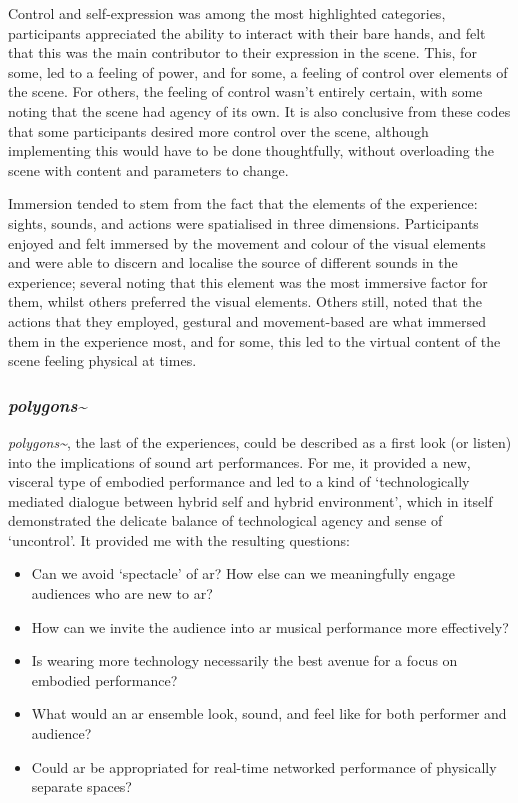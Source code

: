 Control and self-expression was among the most highlighted categories, participants appreciated the ability to interact with their bare hands, and felt that this was the main contributor to their expression in the scene. This, for some, led to a feeling of power, and for some, a feeling of control over elements of the scene. For others, the feeling of control wasn't entirely certain, with some noting that the scene had agency of its own. It is also conclusive from these codes that some participants desired more control over the scene, although implementing this would have to be done thoughtfully, without overloading the scene with content and parameters to change.

Immersion tended to stem from the fact that the elements of the experience: sights, sounds, and actions were spatialised in three dimensions. Participants enjoyed and felt immersed by the movement and colour of the visual elements and were able to discern and localise the source of different sounds in the experience; several noting that this element was the most immersive factor for them, whilst others preferred the visual elements. Others still, noted that the actions that they employed, gestural and movement-based are what immersed them in the experience most, and for some, this led to the virtual content of the scene feeling physical at times.

\subsubsection{\textit{polygons\textasciitilde{}}}
\textit{polygons\textasciitilde{}}, the last of the experiences, could be described as a first look (or listen) into the implications of sound \gls{art} performances. For me, it provided a new, visceral type of embodied performance and led to a kind of `technologically mediated dialogue between hybrid self and hybrid environment', which in itself demonstrated the delicate balance of technological agency and sense of `uncontrol'. It provided me with the resulting questions: 
\begin{itemize}
    \item Can we avoid `spectacle' of \gls{ar}? How else can we meaningfully engage audiences who are new to \gls{ar}?
    \item How can we invite the audience into \gls{ar} musical performance more effectively?
    \item Is wearing more technology necessarily the best avenue for a focus on embodied performance?
    \item What would an \gls{ar} ensemble look, sound, and feel like for both performer and audience?
    \item Could \gls{ar} be appropriated for real-time networked performance of physically separate spaces?
\end{itemize}




